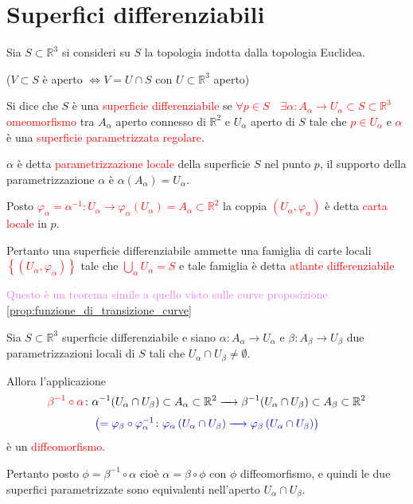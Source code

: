     \section{Superfici differenziabili}
        \begin{definizione}
        Sia $S \subset \mathbb{R}^3$ si consideri su $S$ la topologia indotta dalla topologia Euclidea.

        \textcolor{blu}{($V \subset S$ è aperto $\iff V=U \cap S$ con $U \subset \mathbb{R}^3$ aperto)}

        Si dice che $S$ è una \textcolor{red}{superficie differenziabile} se \textcolor{red}{$\forall p \in S \quad \exists \alpha \colon A_\alpha \to U_\alpha \subset S \subset \mathbb{R}^3$ 
        omeomorfismo} tra $A_\alpha$ aperto connesso di $\mathbb{R}^2$ e $U_\alpha$ aperto di $S$ tale che \textcolor{red}{$p \in U_\alpha$}
        e \textcolor{red}{$\alpha$} è una \textcolor{red}{superficie parametrizzata regolare}.

        $\alpha$ è detta \textcolor{red}{parametrizzazione locale} della superficie $S$ nel punto $p$, il supporto della parametrizzazione $\alpha$ è $\alpha(A_\alpha) = U_\alpha$.

        Posto \textcolor{red}{$\varphi_\alpha = \alpha^{-1} \colon U_\alpha \to \varphi_\alpha(U_\alpha) = A_\alpha \subset \mathbb{R}^2$} 
        la coppia \textcolor{red}{$(U_\alpha, \varphi_\alpha)$} è detta \textcolor{red}{carta locale} in $p$.

        Pertanto una superficie differenziabile ammette una famiglia di carte locali \textcolor{red}{$\left\{ (U_\alpha, \varphi_\alpha) \right\}$} tale che
        \textcolor{red}{$\displaystyle \bigcup_\alpha U_\alpha = S$} e tale famiglia è detta \textcolor{red}{atlante differenziabile}
        \end{definizione}
        \textcolor{violet}{Questo è un teorema simile a quello visto sulle curve proposizione \ref{prop:funzione_di_transizione_curve}}
        \begin{teorema}
        \label{th:superfici_parametrizzazioni_equivalenti}
        Sia $S \subset \mathbb{R}^3$ superficie differenziabile e siano $\alpha \colon A_\alpha \to U_\alpha$ e $\beta \colon A_\beta \to U_\beta$ due 
        parametrizzazioni locali di $S$ tali che $U_\alpha \cap U_\beta \neq \emptyset$. 
        
        Allora l'applicazione
        \[ \textcolor{red}{\beta^{-1} \circ \alpha} \colon \alpha^{-1}(U_\alpha \cap U_\beta) \subset A_\alpha \subset \mathbb{R}^2 \xrightarrow[]{\quad}  \beta^{-1}(U_\alpha \cap U_\beta) \subset A_\beta \subset \mathbb{R}^2 \]
        \[ \color{blu} \left(= \varphi_\beta \circ \varphi_\alpha^{-1} \colon \varphi_\alpha \left(U_\alpha \cap U_\beta \right) \xrightarrow[]{\quad} \varphi_\beta \left(U_\alpha \cap U_\beta \right) \right) \]
        è un \textcolor{red}{diffeomorfismo}.

        Pertanto posto $\phi= \beta^{-1} \circ \alpha$ cioè $\alpha = \beta \circ \phi$ con $\phi$ diffeomorfismo, e quindi
        le due superfici parametrizzate sono equivalenti nell'aperto $U_\alpha \cap U_\beta$.
        \end{teorema}
